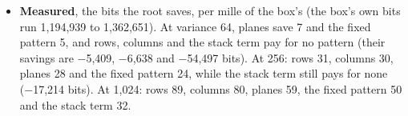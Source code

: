 \begin{itemize}
\begin{itemize}
\item the null names no root;
\item in every planted run, the planted term is the root or there is none, never another term;
\item at 1,024 every term is the root;
\item the root's residual and pattern return the box exactly.
\end{itemize}
\item \textbf{Measured}, the bits the root saves, per mille of the box's (the box's own bits run 1,194,939 to 1,362,651). At variance 64, planes save 7 and the fixed pattern 5, and rows, columns and the stack term pay for no pattern (their savings are −5,409, −6,638 and −54,497 bits). At 256: rows 31, columns 30, planes 28 and the fixed pattern 24, while the stack term still pays for none (−17,214 bits). At 1,024: rows 89, columns 80, planes 59, the fixed pattern 50 and the stack term 32.


\end{itemize}

